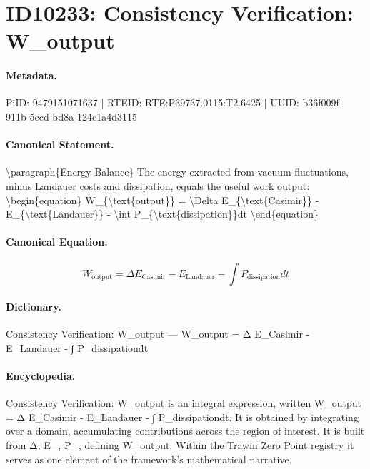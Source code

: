\section*{ID10233: Consistency Verification: W\_output}
\paragraph{Metadata.}
PiID: 9479151071637 | RTEID: RTE:P39737.0115:T2.6425 | UUID: b36f009f-911b-5ccd-bd8a-124c1a4d3115

\paragraph{Canonical Statement.}
\textbackslash{}paragraph\{Energy Balance\} The energy extracted from vacuum fluctuations, minus Landauer costs and dissipation, equals the useful work output: \textbackslash{}begin\{equation\} W\_\{\textbackslash{}text\{output\}\} = \textbackslash{}Delta E\_\{\textbackslash{}text\{Casimir\}\} - E\_\{\textbackslash{}text\{Landauer\}\} - \textbackslash{}int P\_\{\textbackslash{}text\{dissipation\}\}dt \textbackslash{}end\{equation\}

\paragraph{Canonical Equation.}
\[
W_{\text{output}} = \Delta E_{\text{Casimir}} - E_{\text{Landauer}} - \int P_{\text{dissipation}}dt
\]

\paragraph{Dictionary.}
Consistency Verification: W\_output — W\_output = Δ E\_Casimir - E\_Landauer - ∫ P\_dissipationdt

\paragraph{Encyclopedia.}
Consistency Verification: W\_output is an integral expression, written W\_output = Δ E\_Casimir - E\_Landauer - ∫ P\_dissipationdt. It is obtained by integrating over a domain, accumulating contributions across the region of interest. It is built from Δ, E\_, P\_, defining W\_output. Within the Trawin Zero Point registry it serves as one element of the framework's mathematical narrative.
